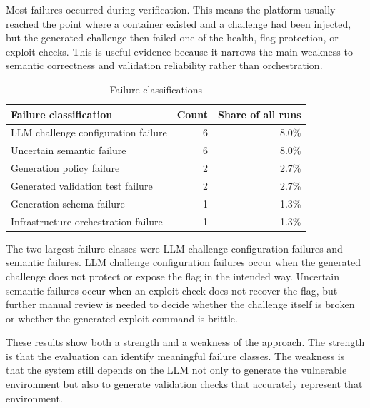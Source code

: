 Most failures occurred during verification. This means the platform usually reached the point where a container existed and a challenge had been injected, but the generated challenge then failed one of the health, flag protection, or exploit checks. This is useful evidence because it narrows the main weakness to semantic correctness and validation reliability rather than orchestration.

\begin{table}[htbp]
	\centering
	\caption{Failure classifications}
	\label{tab:failure-classes}
	\begin{tabular}{|p{}|r|r|}
		\hline
		\textbf{Failure classification}      & \textbf{Count} & \textbf{Share of all runs} \\
		\hline
		LLM challenge configuration failure  & 6              & 8.0\%                      \\
		\hline
		Uncertain semantic failure           & 6              & 8.0\%                      \\
		\hline
		Generation policy failure            & 2              & 2.7\%                      \\
		\hline
		Generated validation test failure    & 2              & 2.7\%                      \\
		\hline
		Generation schema failure            & 1              & 1.3\%                      \\
		\hline
		Infrastructure orchestration failure & 1              & 1.3\%                      \\
		\hline
	\end{tabular}
\end{table}


The two largest failure classes were LLM challenge configuration failures and semantic failures. LLM challenge configuration failures occur when the generated challenge does not protect or expose the flag in the intended way. Uncertain semantic failures occur when an exploit check does not recover the flag, but further manual review is needed to decide whether the challenge itself is broken or whether the generated exploit command is brittle.

These results show both a strength and a weakness of the approach. The strength is that the evaluation can identify meaningful failure classes. The weakness is that the system still depends on the LLM not only to generate the vulnerable environment but also to generate validation checks that accurately represent that environment.

